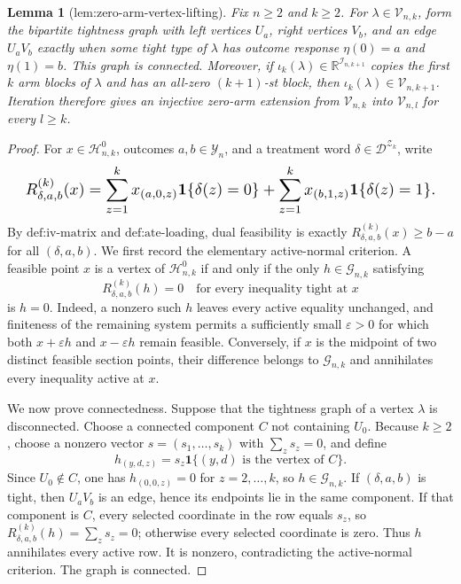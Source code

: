 \documentclass{article}
\newtheorem{lemma}{Lemma}
\begin{document}
\begin{lemma}[lem:zero-arm-vertex-lifting]\label{lem:zero-arm-vertex-lifting}
Fix \(n\ge2\) and \(k\ge2\). For \(\lambda\in\mathcal V_{n,k}\), form the bipartite tightness graph with left vertices \(U_a\), right vertices \(V_b\), and an edge \(U_aV_b\) exactly when some tight type of \(\lambda\) has outcome response \(\eta(0)=a\) and \(\eta(1)=b\). This graph is connected. Moreover, if \(\iota_k(\lambda)\in\mathbb R^{\mathcal I_{n,k+1}}\) copies the first \(k\) arm blocks of \(\lambda\) and has an all-zero \((k+1)\)-st block, then \(\iota_k(\lambda)\in\mathcal V_{n,k+1}\). Iteration therefore gives an injective zero-arm extension from \(\mathcal V_{n,k}\) into \(\mathcal V_{n,l}\) for every \(l\ge k\).
\end{lemma}
\begin{proof}
For \(x\in\mathcal H^0_{n,k}\), outcomes \(a,b\in\mathcal Y_n\), and a treatment word \(\delta\in\mathcal D^{\mathcal Z_k}\), write
\[
\makebox[\linewidth][c]{\resizebox{0.98\linewidth}{!}{\par\noindent \makebox[\linewidth][c]{\resizebox{0.98\linewidth}{!}{\(\displaystyle \displaystyle R^{(k)}_{\delta,a,b}(x)=\sum_{z=1}^k x_{(a,0,z)}\mathbf 1\{\delta(z)=0\}+\sum_{z=1}^k x_{(b,1,z)}\mathbf 1\{\delta(z)=1\}.\)}}\par\noindent}}
\]
By \(\text{def:iv-matrix}\) and \(\text{def:ate-loading}\), dual feasibility is exactly \(R^{(k)}_{\delta,a,b}(x)\ge b-a\) for all \((\delta,a,b)\). We first record the elementary active-normal criterion. A feasible point \(x\) is a vertex of \(\mathcal H^0_{n,k}\) if and only if the only \(h\in\mathcal G_{n,k}\) satisfying
\[
R^{(k)}_{\delta,a,b}(h)=0
\quad\text{for every inequality tight at }x
\]
is \(h=0\). Indeed, a nonzero such \(h\) leaves every active equality unchanged, and finiteness of the remaining system permits a sufficiently small \(\varepsilon>0\) for which both \(x+\varepsilon h\) and \(x-\varepsilon h\) remain feasible. Conversely, if \(x\) is the midpoint of two distinct feasible section points, their difference belongs to \(\mathcal G_{n,k}\) and annihilates every inequality active at \(x\).

We now prove connectedness. Suppose that the tightness graph of a vertex \(\lambda\) is disconnected. Choose a connected component \(C\) not containing \(U_0\). Because \(k\ge2\), choose a nonzero vector \(s=(s_1,\ldots,s_k)\) with \(\sum_zs_z=0\), and define
\[
h_{(y,d,z)}=s_z\mathbf 1\{(y,d)\text{ is the vertex of }C\}.
\]
Since \(U_0\notin C\), one has \(h_{(0,0,z)}=0\) for \(z=2,\ldots,k\), so \(h\in\mathcal G_{n,k}\). If \((\delta,a,b)\) is tight, then \(U_aV_b\) is an edge, hence its endpoints lie in the same component. If that component is \(C\), every selected coordinate in the row equals \(s_z\), so \(R^{(k)}_{\delta,a,b}(h)=\sum_zs_z=0\); otherwise every selected coordinate is zero. Thus \(h\) annihilates every active row. It is nonzero, contradicting the active-normal criterion. The graph is connected.


\end{proof}
\end{document}
